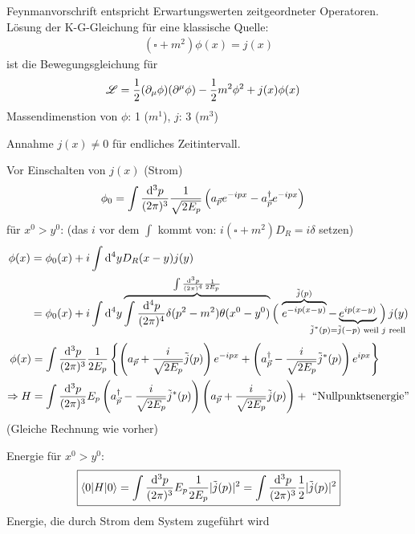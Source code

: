  Feynmanvorschrift entspricht Erwartungswerten zeitgeordneter Operatoren. 
 \\
 Lösung der K-G-Gleichung für eine klassische Quelle:
	 \begin{align*}
		 (\square + m^2) \phi(x) = j(x)
	 \end{align*}
ist die Bewegungsgleichung für 
	\begin{align*}
		\mathscr{L} &= \frac{1}{2} (\partial_\mu \phi) (\partial^\mu \phi) - \frac{1}{2} m^2 \phi^2 + j(x) \phi(x)
	\end{align*}
Massendimenstion von $\phi$: 1 ($m^1$), $j$: 3 ($m^3$)

Annahme $j(x) \neq 0$ für endliches Zeitintervall.

Vor Einschalten von $j(x)$ (Strom)
	\begin{align*}
		\phi_0 &= \int \frac{\mathrm{d}^3 p}{(2\pi)^3} \frac{1}{\sqrt{2 E_p}} 
		\left(
			a_{\vec{p}} e^{-ipx} - a_{\vec{p}}^\dagger e^{-ipx}
		\right)
	\end{align*}
für $x^0 > y^0$: (das $i$ vor dem $\int$ kommt von: $i(\square+m^2)D_R = i\delta$ setzen)
	\begin{align*}
		\phi(x) &= \phi_0(x) + i\int \diff^4 y D_R (x- y) j(y) \\
		&= \phi_0 (x) + i \int \diff^4 y 
		\overbrace{\int\frac{\diff^4 p}{(2 \pi)^4} \delta(p^2 -m^2)\theta(x^0 - y^0)}^{\mathclap{\int \frac{\diff^3 p}{(2\pi)^4} \frac{1}{2 E_p}}}
		\left( \vphantom{e^{-ip(x-y)} - e^{ip(x-y)}} \right.
			\overbrace{e^{-ip(x-y)}}^{\mathclap{\tilde{j}(p)}} 
			- \underbrace{e^{ip(x-y)}}_{\mathclap{\tilde{j}^*(p)= \tilde{j}(-p) \text{ weil } j \text{ reell}}}
		\left. \vphantom{e^{-ip(x-y)} - e^{ip(x-y)}} \right)j(y)
	\end{align*}
	\begin{align*}
		\phi(x) &= \int \frac{\mathrm{d}^3 p}{(2\pi)^3} \frac{1}{2 E_p}
		\left\{
			\left(
				a_{\vec{p}} + \frac{i}{\sqrt{2 E_p}} \tilde{j}(p) 
			\right)e^{-ipx}
			+
			\left(
				a_{\vec{p}}^\dagger - \frac{i}{\sqrt{2 E_p}} \tilde{j}^*(p) 
			\right)e^{ipx}
		\right\} \\
		\Rightarrow H &= \int \frac{\mathrm{d}^3 p}{(2 \pi)^3} E_p 
		\left(
			a_{\vec{p}}^\dagger - \frac{i}{\sqrt{2 E_p}} \tilde{j}^*(p) 
		\right)
		\left(
		a_{\vec{p}} + \frac{i}{\sqrt{2 E_p}} \tilde{j}(p) 
		\right)
		+ \text{ ``Nullpunktsenergie''}
	\end{align*}
(Gleiche Rechnung wie vorher)

Energie für $x^0 > y^0$:
	\begin{align*}
		\boxed{
				\braket{0 | H | 0} =
				\int \frac{\mathrm{d}^3 p}{(2 \pi)^3} E_p \frac{1}{2E_p} | \tilde{j}(p)|^2 
				= \int \frac{\mathrm{d}^3 p}{(2 \pi)^3} \frac{1}{2} | \tilde{j}(p)|^2  
			}
	\end{align*}
Energie, die durch Strom dem System zugeführt wird

